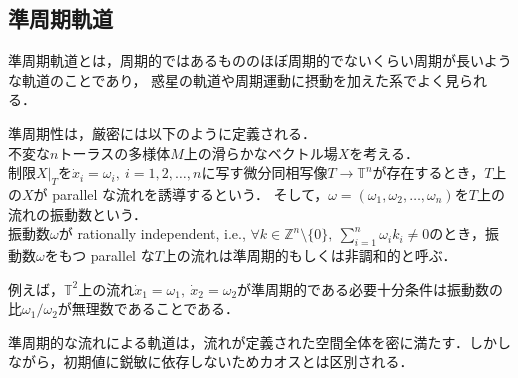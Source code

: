 \documentclass[../main]{subfiles}
\begin{document}
\subsection{準周期軌道}
準周期軌道とは，周期的ではあるもののほぼ周期的でないくらい周期が長いような軌道のことであり，
惑星の軌道や周期運動に摂動を加えた系でよく見られる．

準周期性は，厳密には以下のように定義される\cite{Broer1996}．\\
不変な$n$トーラスの多様体$M$上の滑らかなベクトル場$X$を考える．\\
制限$X|_T$を$\dot{x}_i=\omega_i,\ i=1,2,\ldots ,n$に写す微分同相写像$T\to \mathbb{T}^n$が存在するとき，$T$上の$X$が parallel な流れを誘導するという．
そして，$\omega=(\omega_1,\omega_2,\ldots,\omega_n)$を$T$上の流れの振動数という．\\
振動数$\omega$が rationally independent, i.e., $\forall k\in\mathbb{Z}^n\setminus \{0\},\ \sum_{i=1}^n\omega_ik_i\neq 0$のとき，振動数$\omega$をもつ parallel な$T$上の流れは準周期的もしくは非調和的と呼ぶ．

例えば，$\mathbb{T}^2$上の流れ$\dot{x}_1=\omega_1,\ \dot{x}_2=\omega_2$が準周期的である必要十分条件は振動数の比$\omega_1/\omega_2$が無理数であることである．

準周期的な流れによる軌道は，流れが定義された空間全体を密に満たす．しかしながら，初期値に鋭敏に依存しないためカオスとは区別される．
\end{document}

